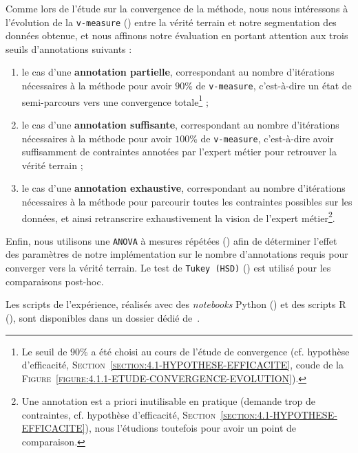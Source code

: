 			Comme lors de l'étude sur la convergence de la méthode, nous nous intéressons à l'évolution de la \texttt{v-measure} (\cite{rosenberg-hirschberg:2007:vmeasure-conditional-entropybased}) entre la vérité terrain et notre segmentation des données obtenue, et nous affinons notre évaluation en portant attention aux trois seuils d'annotations suivants :
			\begin{enumerate}
				\item le cas d'une \textbf{annotation partielle}, correspondant au nombre d'itérations nécessaires à la méthode pour avoir $90$\% de \texttt{v-measure}, c'est-à-dire un état de semi-parcours vers une convergence totale\footnote{
					Le seuil de $90$\% a été choisi au cours de l'étude de convergence (cf. hypothèse d'efficacité, \textsc{Section~\ref{section:4.1-HYPOTHESE-EFFICACITE}}, coude de la \textsc{Figure~\ref{figure:4.1.1-ETUDE-CONVERGENCE-EVOLUTION}}).
				} ;
				\item le cas d'une \textbf{annotation suffisante}, correspondant au nombre d'itérations nécessaires à la méthode pour avoir $100$\% de \texttt{v-measure}, c'est-à-dire avoir suffisamment de contraintes annotées par l'expert métier pour retrouver la vérité terrain ;
				\item le cas d'une \textbf{annotation exhaustive}, correspondant au nombre d'itérations nécessaires à la méthode pour parcourir toutes les contraintes possibles sur les données, et ainsi retranscrire exhaustivement la vision de l'expert métier\footnote{
					Une annotation est a priori inutilisable en pratique (demande trop de contraintes, cf. hypothèse d'efficacité, \textsc{Section~\ref{section:4.1-HYPOTHESE-EFFICACITE}}), nous l'étudions toutefois pour avoir un point de comparaison.
				}.
			\end{enumerate}
			
			Enfin, nous utilisons une \texttt{ANOVA} à mesures répétées (\cite{girden:1992:anova}) afin de déterminer l'effet des paramètres de notre implémentation sur le nombre d'annotations requis pour converger vers la vérité terrain. Le test de \texttt{Tukey (HSD)} (\cite{tukey:1949:comparing-individual-means}) est utilisé pour les comparaisons post-hoc.
			
			\begin{leftBarInformation}
				Les scripts de l'expérience, réalisés avec des \textit{notebooks} Python (\cite{van-rossum-drake:2009:python-reference-manual}) et des scripts R (\cite{r-core-team:2017:language-environment-statistical}), sont disponibles dans un dossier dédié de~\cite{schild:2021:cognitivefactory-interactiveclusteringcomparativestudy}.
			\end{leftBarInformation}

